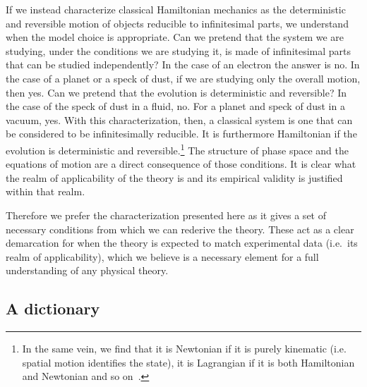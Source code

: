 \documentclass[11pt]{elsarticle}
\begin{document}
If we instead characterize classical Hamiltonian mechanics as the deterministic and reversible motion of objects reducible to infinitesimal parts, we understand when the model choice is appropriate. Can we pretend that the system we are studying, under the conditions we are studying it, is made of infinitesimal parts that can be studied independently? In the case of an electron the answer is no. In the case of a planet or a speck of dust, if we are studying only the overall motion, then yes. Can we pretend that the evolution is deterministic and reversible? In the case of the speck of dust in a fluid, no. For a planet and speck of dust in a vacuum, yes. With this characterization, then, a classical system is one that can be considered to be infinitesimally reducible. It is furthermore Hamiltonian if the evolution is deterministic and reversible.\footnote{In the same vein, we find that it is Newtonian if it is purely kinematic (i.e. spatial motion identifies the state), it is Lagrangian if it is both Hamiltonian and Newtonian and so on~\cite{AoPPhy1}.} The structure of phase space and the equations of motion are a direct consequence of those conditions. It is clear what the realm of applicability of the theory is and its empirical validity is justified within that realm.

Therefore we prefer the characterization presented here as it gives a set of necessary conditions from which we can rederive the theory. These act as a clear demarcation for when the theory is expected to match experimental data (i.e.~its realm of applicability), which we believe is a necessary element for a full understanding of any physical theory.

\subsection*{A dictionary}
\end{document}
